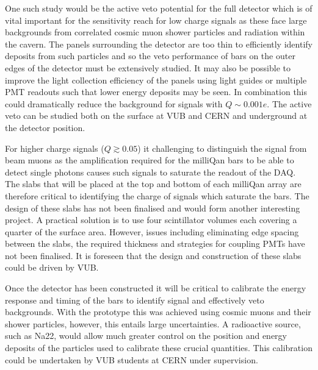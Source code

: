 \documentclass[11pt]{article}
\theoremstyle{plain} \numberwithin{equation}{section}
\theoremstyle{definition}
\begin{document}
One such study would be the active veto potential for the full detector which
is of vital important for the sensitivity reach for low charge signals as these face large
backgrounds from correlated cosmic muon shower particles and radiation within the cavern. 
The panels surrounding the detector are too thin to efficiently identify deposits from such particles
and so the veto performance of bars on the outer edges of the detector must be extensively 
studied. It may also be possible to improve the light collection efficiency of the panels
using light guides or multiple PMT readouts such that lower energy deposits may be seen. 
In combination this could dramatically reduce the background for signals with $Q \sim 0.001e$.
The active veto can be studied both on the surface at VUB and
CERN and underground at the detector position.

For higher charge signals ($Q \gtrsim 0.05$) it challenging to distinguish the 
signal from beam muons as the amplification required for the milliQan bars to
be able to detect single photons causes such signals to saturate the readout 
of the DAQ. The slabs that will be placed at the top and bottom of each milliQan array
are therefore critical to identifying the charge of signals which saturate the bars.
The design of these slabs has not been finalised and would form another interesting
project. A practical solution is to use four scintillator volumes
each covering a quarter of the surface area. However, issues including eliminating
edge spacing between the slabs, the required thickness and strategies for coupling
PMTs have not been finalised. It is foreseen that the design and construction of
these slabs could be driven by VUB.

Once the detector has been constructed it will be critical to calibrate the 
energy response and timing of the bars to identify signal and effectively veto backgrounds. 
With the prototype this was achieved using
cosmic muons and their shower particles, however, this entails large
uncertainties. A radioactive source, such as Na22, would allow much greater control 
on the position and energy deposits of the particles used to calibrate these crucial
quantities. This calibration could be undertaken by VUB students at CERN under supervision.

\end{document}

